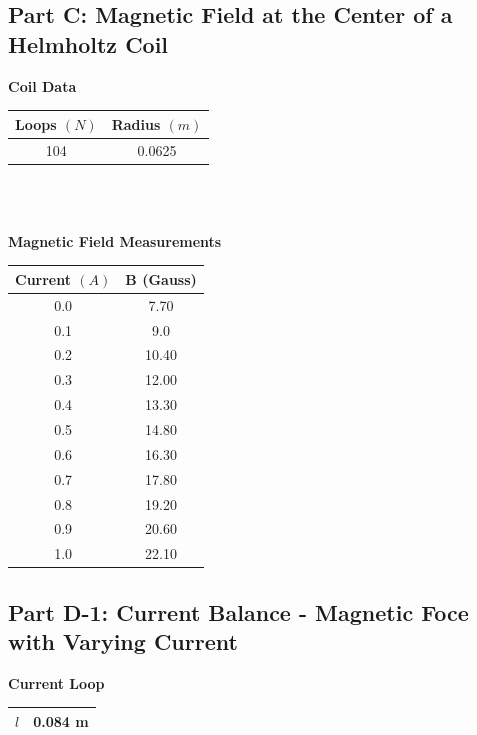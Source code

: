\documentclass[titlepage]{article}
\begin{document}
\subsection{Part C: Magnetic Field at the Center of a Helmholtz Coil}\label{sub:part_c_magnetic_field_at_the_center_of_a_helmholtz_coil-data}

\begin{center}\label{tbl3}
	\textbf{Coil Data}\\
	\begin{tabular}{cc}
	\hline
	Loops $(N)$ & Radius $(m)$\\
	\hline
	104 & 0.0625\\
	\hline
	\end{tabular}
\end{center}\\
\\

\begin{center}\label{tbl4}
	\textbf{Magnetic Field Measurements}\\
	\begin{tabular}{cc}
	\hline
	Current $(A)$ & B (Gauss)\\
	\hline
	0.0 & 7.70\\
	\hline
	0.1 & 9.0\\
	\hline
	0.2 & 10.40\\
	\hline
	0.3 & 12.00\\
	\hline
	0.4 & 13.30\\
	\hline
	0.5 & 14.80\\
	\hline
	0.6 & 16.30\\
	\hline
	0.7 & 17.80\\
	\hline
	0.8 & 19.20\\
	\hline
	0.9 & 20.60\\
	\hline
	1.0 & 22.10\\
	\hline
	\end{tabular}
\end{center}

\subsection{Part D-1: Current Balance - Magnetic Foce with Varying Current}\label{sub:part_d_1_current_balance_magnetic_foce_with_varying_current-data}

\begin{center}\label{tbl5}
	\textbf{Current Loop}\\
	\begin{tabular}{cc}
	\hline
	$l$ & 0.084 m\\
	\hline
	\end{tabular}
\end{center}\\
\\
\end{document}

